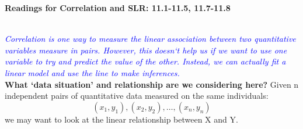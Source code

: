 \begin{center}\large\textbf{Readings for Correlation and SLR: 11.1-11.5, 11.7-11.8}\\ %
\normalsize \end{center}
\large ~\hrulefill
~\\\textit{\textcolor{blue}{Correlation is one way to measure the linear association between two quantitative variables measure in pairs.  However, this doesn`t help us if we want to use one variable to try and predict the value of the other.  Instead, we can actually fit a linear model and use the line to make inferences.}}\\

\textbf{What `data situation' and relationship are we considering here?}
Given n independent pairs of quantitative data measured on the same individuals:  
$$(x_1,y_1), (x_2,y_2), \ldots, (x_n,y_n)$$
we may want to look at the linear relationship between X and Y.\\

